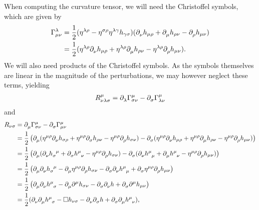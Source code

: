When computing the curvature tensor, we will need the Christoffel symbols, which are given by
\begin{align*}
	\chris{\lambda}{\mu}{\nu} &= \frac{1}{2}(\eta^{\lambda\rho} - \eta^{\sigma\rho}\eta^{\lambda\gamma}h_{\gamma\sigma})(\del{\nu}{h_{\mu\rho}} + \del{\mu}{h_{\rho\nu}} - \del{\rho}{h_{\mu\nu}}) \\
	                          &= \frac{1}{2}(\eta^{\lambda\rho}\del{\nu}{h_{\mu\rho}} + \eta^{\lambda\rho}\del{\mu}{h_{\rho\nu}} - \eta^{\lambda\rho}\del{\rho}{h_{\mu\nu}}).
\end{align*}
We will also need products of the Christoffel symbols. As the symbols themselves are linear in the magnitude of the perturbations, we may however neglect these terms, yielding
\begin{align*}
	\tensor*{R}{^{\mu}_{\nu\lambda\sigma}} = \del{\lambda}{\chris{\mu}{\sigma}{\nu}} - \del{\sigma}{\chris{\mu}{\lambda}{\nu}}
\end{align*}
and
\begin{align*}
	R_{\nu\sigma} &= \del{\mu}{\chris{\mu}{\sigma}{\nu}} - \del{\sigma}{\chris{\mu}{\mu}{\nu}} \\
	              &= \frac{1}{2}\left(\del{\mu}{(\eta^{\mu\rho}\del{\nu}{h_{\sigma\rho}} + \eta^{\mu\rho}\del{\sigma}{h_{\rho\nu}} - \eta^{\mu\rho}\del{\rho}{h_{\sigma\nu}})} - \del{\sigma}{(\eta^{\mu\rho}\del{\nu}{h_{\mu\rho}} + \eta^{\mu\rho}\del{\mu}{h_{\rho\nu}} - \eta^{\mu\rho}\del{\rho}{h_{\mu\nu}})}\right) \\
	              &= \frac{1}{2}\left(\del{\mu}{(\del{\nu}{\tensor{h}{_{\sigma}^{\mu}}} + \del{\sigma}{\tensor{h}{^{\mu}_{\nu}}} - \eta^{\mu\rho}\del{\rho}{h_{\sigma\nu}})} - \del{\sigma}{(\del{\nu}{\tensor{h}{^{\mu}_{\mu}}} + \del{\mu}{\tensor{h}{^{\mu}_{\nu}}} - \eta^{\mu\rho}\del{\rho}{h_{\mu\nu}})}\right) \\
	              &= \frac{1}{2}\left(\del{\mu}{\del{\nu}{\tensor{h}{_{\sigma}^{\mu}}}} - \del{\mu}{\eta^{\mu\rho}\del{\rho}{h_{\sigma\nu}}} - \del{\sigma}{\del{\nu}{\tensor{h}{^{\mu}_{\mu}}}} + \del{\sigma}{\eta^{\mu\rho}\del{\rho}{h_{\mu\nu}}}\right) \\
	              &= \frac{1}{2}\left(\del{\mu}{\del{\nu}{\tensor{h}{^{\mu}_{\sigma}}}} - \del{\mu}{\del[\mu]{}{h_{\sigma\nu}}} - \del{\sigma}{\del{\nu}{h}} + \del{\sigma}{\del[\mu]{}{h_{\mu\nu}}}\right) \\
	              &= \frac{1}{2}(\del{\nu}{\del{\mu}{\tensor{h}{^{\mu}_{\sigma}}}} - \square h_{\nu\sigma} - \del{\nu}{\del{\sigma}{h}} + \del{\sigma}{\del{\mu}{\tensor{h}{^{\mu}_{\nu}}}}),
\end{align*}
